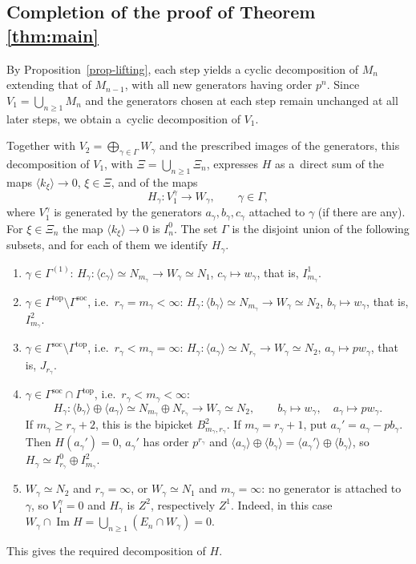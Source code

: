 \documentclass[11pt]{article}
\theoremstyle{definition}
\newcommand{\ImH}{\operatorname{Im}}
\begin{document}
\subsection{Completion of the proof of Theorem \ref{thm:main}}

By Proposition~\ref{prop-lifting}, each step yields a cyclic
decomposition of $M_n$ extending that of $M_{n-1}$, with all new
generators having order $p^n$. Since $V_1=\bigcup_{n\geq1}M_n$ and the generators chosen
at each step remain unchanged at all later steps, we obtain
a~cyclic decomposition of $V_1$.

Together with $V_2=\bigoplus_{\gamma\in\Gamma}W_\gamma$ and the prescribed images of the
generators, this decomposition of $V_1$, with $\Xi=\bigcup_{n\geq1}\Xi_n$, expresses $H$ as
a~direct sum of the maps $\langle k_\xi\rangle\to0$, $\xi\in\Xi$, and of the maps
$$
H_\gamma:V_1^\gamma\longrightarrow W_\gamma,\qquad \gamma\in\Gamma,
$$
where $V_1^\gamma$ is generated by the generators $a_\gamma,b_\gamma,c_\gamma$ attached to
$\gamma$ (if there are any). For $\xi\in\Xi_n$ the map $\langle k_\xi\rangle\to0$ is $I_n^0$.
The set $\Gamma$ is the disjoint union of the following subsets, and for each of them we
identify $H_\gamma$.
\begin{enumerate}
	\item[(a)] $\gamma\in\Gamma^{(1)}$: $H_\gamma:\langle c_\gamma\rangle\simeq N_{m_\gamma}\to
	W_\gamma\simeq N_1$, $c_\gamma\mapsto w_\gamma$, that is, $I^1_{m_\gamma}$.
	\item[(b)] $\gamma\in\Gamma^{\mathrm{top}}\setminus\Gamma^{\mathrm{soc}}$, i.e.\
	$r_\gamma=m_\gamma<\infty$: $H_\gamma:\langle b_\gamma\rangle\simeq N_{m_\gamma}\to
	W_\gamma\simeq N_2$, $b_\gamma\mapsto w_\gamma$, that is, $I^2_{m_\gamma}$.
	\item[(c)] $\gamma\in\Gamma^{\mathrm{soc}}\setminus\Gamma^{\mathrm{top}}$, i.e.\
	$r_\gamma<m_\gamma=\infty$: $H_\gamma:\langle a_\gamma\rangle\simeq N_{r_\gamma}\to
	W_\gamma\simeq N_2$, $a_\gamma\mapsto pw_\gamma$, that is, $J_{r_\gamma}$.
	\item[(d)] $\gamma\in\Gamma^{\mathrm{soc}}\cap\Gamma^{\mathrm{top}}$, i.e.\
	$r_\gamma<m_\gamma<\infty$:
	$$
	H_\gamma:\langle b_\gamma\rangle\oplus\langle a_\gamma\rangle\simeq
	N_{m_\gamma}\oplus N_{r_\gamma}\longrightarrow W_\gamma\simeq N_2,
	\qquad b_\gamma\mapsto w_\gamma,\quad a_\gamma\mapsto pw_\gamma .
	$$
	If $m_\gamma\geq r_\gamma+2$, this is the bipicket $B^2_{m_\gamma,r_\gamma}$.
	If $m_\gamma=r_\gamma+1$, put $a_\gamma'=a_\gamma-pb_\gamma$. Then $H(a_\gamma')=0$,
	$a_\gamma'$ has order $p^{r_\gamma}$ and
	$\langle a_\gamma\rangle\oplus\langle b_\gamma\rangle
	=\langle a_\gamma'\rangle\oplus\langle b_\gamma\rangle$,
	so $H_\gamma\simeq I^0_{r_\gamma}\oplus I^2_{m_\gamma}$.
	\item[(e)] $W_\gamma\simeq N_2$ and $r_\gamma=\infty$, or $W_\gamma\simeq N_1$ and
	$m_\gamma=\infty$: no generator is attached to $\gamma$, so $V_1^\gamma=0$ and $H_\gamma$
	is $Z^2$, respectively $Z^1$. Indeed, in this case
	$W_\gamma\cap\ImH H=\bigcup_{n\geq1}(E_n\cap W_\gamma)=0$.
\end{enumerate}
This gives the required decomposition of $H$.
\end{document}
